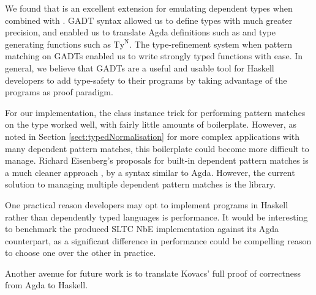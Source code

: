We found that  is an excellent extension for emulating dependent types when combined with . GADT syntax allowed us to define types  with much greater precision, and enabled us to translate Agda  definitions such as  and type generating functions such as $\text{Ty}^\text{N}$. The type-refinement system when pattern matching on GADTs enabled us to write strongly typed functions with ease.
In general, we believe that GADTs are a useful and usable tool for Haskell developers to add type-safety to their programs by taking advantage of the programs as proof paradigm. 

For our implementation, the class instance trick for performing pattern matches on the type worked well, with fairly little amounts of boilerplate. However, as noted in Section \ref{sect:typedNormalisation} for more complex applications with many dependent pattern matches, this boilerplate could become more difficult to manage. Richard Eisenberg's proposals for built-in dependent pattern matches is a much cleaner approach , by a syntax similar to Agda. However, the current solution to managing multiple dependent pattern matches is the  library. 


One practical reason developers may opt to implement programs in Haskell rather than dependently typed languages is performance. It would be interesting to benchmark the produced SLTC NbE implementation against its Agda counterpart, as a significant difference in performance could be compelling reason to choose one over the other in practice.

Another avenue for future work is to translate Kovacs' full proof of correctness from Agda to Haskell. 

